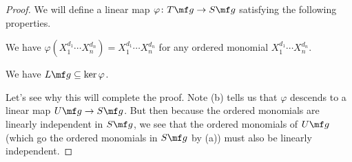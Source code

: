 \documentclass[../notes.tex]{subfiles}
\begin{document}
\begin{proof}
	We will define a linear map $\varphi\colon T\mf g\to S\mf g$ satisfying the following properties.
	\begin{listalph}
		\item We have $\varphi\left(X_1^{d_1}\cdots X_n^{d_n}\right)=X_1^{d_1}\cdots X_n^{d_n}$ for any ordered monomial $X_1^{d_1}\cdots X_n^{d_n}$.
		\item We have $L\mf g\subseteq\ker\varphi$.
	\end{listalph}
	Let's see why this will complete the proof. Note (b) tells us that $\varphi$ descends to a linear map $U\mf g\to S\mf g$. But then because the ordered monomials are linearly independent in $S\mf g$, we see that the ordered monomials of $U\mf g$ (which go the ordered monomials in $S\mf g$ by (a)) must also be linearly independent.


\end{proof}
\end{document}
